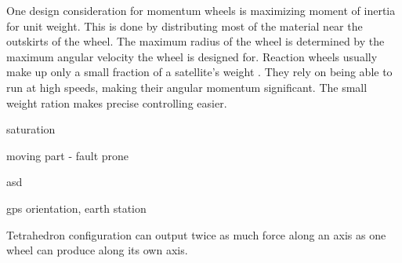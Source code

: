 One design consideration for momentum wheels is maximizing moment of inertia for unit weight. This is done by distributing most of the material near the outskirts of the wheel. The maximum radius of the wheel is determined by the maximum angular velocity the wheel is designed for. 
Reaction wheels usually make up only a small fraction of a satellite's weight . They rely on being able to run at high speeds, making their angular momentum significant. The small weight ration makes precise controlling easier.

saturation

moving part - fault prone

asd

gps orientation, earth station

Tetrahedron configuration can output twice as much force along an axis as one wheel can produce along its own axis.